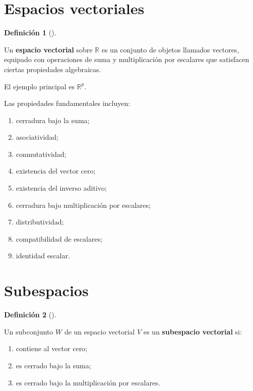 \documentclass[
  spanish,
  11pt,
  letterpaper,
  DIV=11,
  numbers=noendperiod]{scrreprt}
\providecommand{\tightlist}{%
  \setlength{\itemsep}{0pt}\setlength{\parskip}{0pt}}
\theoremstyle{definition}
\newtheorem{definition}{Definición}[chapter]
\theoremstyle{plain}
\theoremstyle{definition}
\theoremstyle{remark}
\begin{document}
\section{Espacios vectoriales}\label{espacios-vectoriales}

\begin{definition}[]\protect\hypertarget{def-espacio-vectorial}{}\label{def-espacio-vectorial}

Un \textbf{espacio vectorial} sobre \(\mathbb{R}\) es un conjunto de
objetos llamados vectores, equipado con operaciones de suma y
multiplicación por escalares que satisfacen ciertas propiedades
algebraicas.

\end{definition}

El ejemplo principal es \(\mathbb{R}^{p}\).

Las propiedades fundamentales incluyen:

\begin{enumerate}
\def\labelenumi{\arabic{enumi}.}
\tightlist
\item
  cerradura bajo la suma;
\item
  asociatividad;
\item
  conmutatividad;
\item
  existencia del vector cero;
\item
  existencia del inverso aditivo;
\item
  cerradura bajo multiplicación por escalares;
\item
  distributividad;
\item
  compatibilidad de escalares;
\item
  identidad escalar.
\end{enumerate}

\section{Subespacios}\label{subespacios}

\begin{definition}[]\protect\hypertarget{def-subespacio}{}\label{def-subespacio}

Un subconjunto \(W\) de un espacio vectorial \(V\) es un
\textbf{subespacio vectorial} si:

\begin{enumerate}
\def\labelenumi{\arabic{enumi}.}
\tightlist
\item
  contiene al vector cero;
\item
  es cerrado bajo la suma;
\item
  es cerrado bajo la multiplicación por escalares.
\end{enumerate}

\end{definition}
\end{document}
